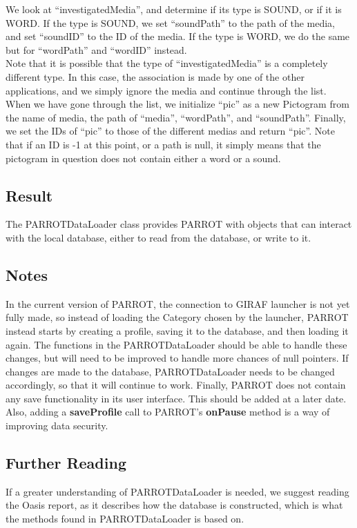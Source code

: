 We look at ``investigatedMedia'', and determine if its type is SOUND, or if it is WORD.
If the type is SOUND, we set ``soundPath'' to the path of the media, and set ``soundID'' to the ID of the media.
If the type is WORD, we do the same but for ``wordPath'' and ``wordID'' instead.\\
Note that it is possible that the type of ``investigatedMedia'' is a completely different type. In this case, the association is made by one of the other applications, and we simply ignore the media and continue through the list.\\
When we have gone through the list, we initialize ``pic'' as a new Pictogram from the name of media, the path of ``media'', ``wordPath'', and ``soundPath''.
Finally, we set the IDs of ``pic'' to those of the different medias and return ``pic''.\newline
Note that if an ID is -1 at this point, or a path is null, it simply means that the pictogram in question does not contain either a word or a sound.

\subsection*{Result}
The PARROTDataLoader class provides PARROT with objects that can interact with the local database, either to read from the database, or write to it.

\subsection*{Notes}
In the current version of PARROT, the connection to GIRAF launcher is not yet fully made, so instead of loading the Category chosen by the launcher, PARROT instead starts by creating a profile, saving it to the database, and then loading it again.
The functions in the PARROTDataLoader should be able to handle these changes, but will need to be improved to handle more chances of null pointers.\newline
If changes are made to the database, PARROTDataLoader needs to be changed accordingly, so that it will continue to work.\newline
Finally, PARROT does not contain any save functionality in its user interface.
This should be added at a later date.
Also, adding a \textbf{saveProfile} call to PARROT's \textbf{onPause} method is a way of improving data security.

\subsection*{Further Reading}
If a greater understanding of PARROTDataLoader is needed, we suggest reading the Oasis report, as it describes how the database is constructed, which is what the methods found in PARROTDataLoader is based on.